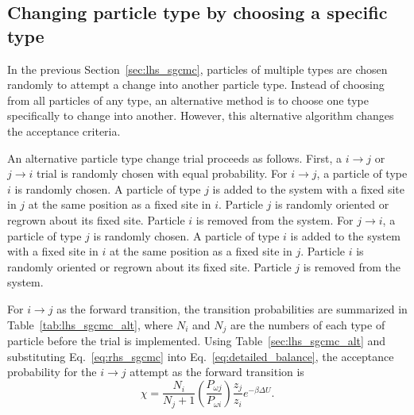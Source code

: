 \begin{figure}

\end{figure}

\subsection{\label{sec:lhs_sgcmc_alt}Changing particle type by choosing a specific type}

In the previous Section~\ref{sec:lhs_sgcmc}, particles of multiple types are chosen randomly to attempt a change into another particle type.
Instead of choosing from all particles of any type, an alternative method is to choose one type specifically to change into another.
However, this alternative algorithm changes the acceptance criteria.

An alternative particle type change trial proceeds as follows.
First, a $i \rightarrow j$ or $j \rightarrow i$ trial is randomly chosen with equal probability.
For $i \rightarrow j$, a particle of type $i$ is randomly chosen.
A particle of type $j$ is added to the system with a fixed site in $j$ at the same position as a fixed site in $i$.
Particle $j$ is randomly oriented or regrown about its fixed site.
Particle $i$ is removed from the system.
For $j \rightarrow i$, a particle of type $j$ is randomly chosen.
A particle of type $i$ is added to the system with a fixed site in $i$ at the same position as a fixed site in $j$.
Particle $i$ is randomly oriented or regrown about its fixed site.
Particle $j$ is removed from the system.

For $i \rightarrow j$ as the forward transition, the transition probabilities are summarized in Table~\ref{tab:lhs_sgcmc_alt}, where $N_i$ and $N_j$ are the numbers of each type of particle before the trial is implemented.
Using Table~\ref{sec:lhs_sgcmc_alt} and substituting Eq.~\ref{eq:rhs_sgcmc} into Eq.~\ref{eq:detailed_balance}, the acceptance probability for the $i\rightarrow j$ attempt as the forward transition is
\begin{equation}
\chi = \frac{N_i}{N_j+1}\left(\frac{P_{\omega j}}{P_{\omega i}}\right)\frac{z_j}{z_i}e^{-\beta\Delta U}.
\label{eq:chisgcmc_alt}
\end{equation}

